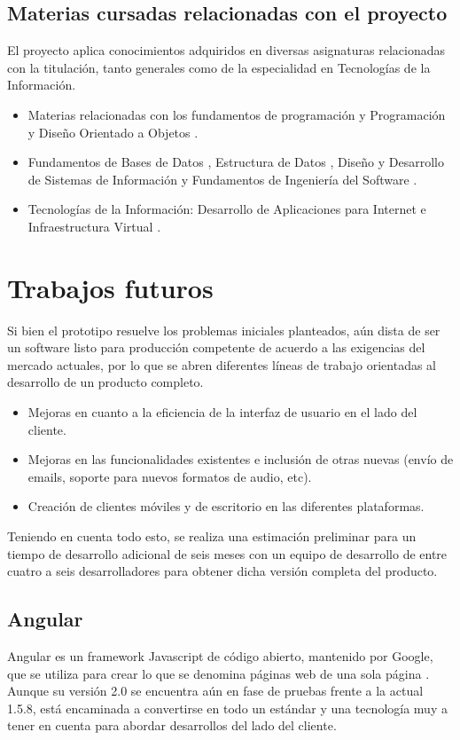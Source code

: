 \subsection{Materias cursadas relacionadas con el proyecto}

El proyecto aplica conocimientos adquiridos en diversas asignaturas relacionadas con la titulación, tanto generales como de la especialidad en Tecnologías de la Información.

\begin{itemize}
	\item Materias relacionadas con los fundamentos de programación \cite{FP} \cite{MP} y Programación y Diseño Orientado a Objetos \cite{PDOO}.
	\item Fundamentos de Bases de Datos \cite{FBD}, Estructura de Datos \cite{ED}, Diseño y Desarrollo de Sistemas de Información \cite{DDSI} y Fundamentos de Ingeniería del Software \cite{FIS}.
	\item Tecnologías de la Información: Desarrollo de Aplicaciones para Internet \cite{DAI} e Infraestructura Virtual \cite{IV}.
\end{itemize}

\section{Trabajos futuros}
Si bien el prototipo resuelve los problemas iniciales planteados, aún dista de ser un software listo para producción competente de acuerdo a las exigencias del mercado actuales, por lo que se abren diferentes líneas de trabajo orientadas al desarrollo de un producto completo.

\begin{itemize}
	\item Mejoras en cuanto a la eficiencia de la interfaz de usuario en el lado del cliente.
	\item Mejoras en las funcionalidades existentes e inclusión de otras nuevas (envío de emails, soporte para nuevos formatos de audio, etc).
	\item Creación de clientes móviles y de escritorio en las diferentes plataformas.
\end{itemize}

Teniendo en cuenta todo esto, se realiza una estimación preliminar para un tiempo de desarrollo adicional de seis meses con un equipo de desarrollo de entre cuatro a seis desarrolladores para obtener dicha versión completa del producto.

\subsection{Angular}
Angular \cite{Angular} es un framework Javascript de código abierto, mantenido por Google, que se utiliza para crear lo que se denomina páginas web de una sola página \cite{SPA}. Aunque su versión 2.0 se encuentra aún en fase de pruebas frente a la actual 1.5.8, está encaminada a convertirse en todo un estándar y una tecnología muy a tener en cuenta para abordar desarrollos del lado del cliente.

